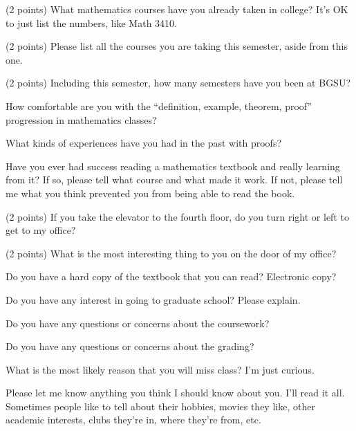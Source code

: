 \yourname


\blist{0.8in}

\item (2 points) What mathematics courses have you already taken in college?
It's OK to just list the numbers, like Math 3410.

\item (2 points) Please list all the courses you are taking this semester, aside from this one.

\item (2 points) Including this semester, how many semesters have you been at BGSU?

\item How comfortable are you with the ``definition, example, theorem, proof'' progression in mathematics classes?

\item What kinds of experiences have you had in the past with proofs?

\item Have you ever had success reading a mathematics textbook and really learning from it?  If so, please tell what course and what made it work.  If not, please tell me what you think prevented you from being able to read the book.

\item (2 points) If you take the elevator to the fourth floor, do you turn right or left to get to my office?

\item (2 points) What is the most interesting thing to you on the door of my office?

\item Do you have a hard copy of the textbook that you can read?  Electronic copy?

\item Do you have any interest in going to graduate school?  Please explain.

\item Do you have any questions or concerns about the coursework?

\item Do you have any questions or concerns about the grading?

\item What is the most likely reason that you will miss class?  I'm just curious.

\item Please let me know anything you think I should know about you.  I'll read it all.  Sometimes people like to tell about their hobbies, movies they like, other academic interests, clubs they're in, where they're from, etc.

\elist

\vfill          %
